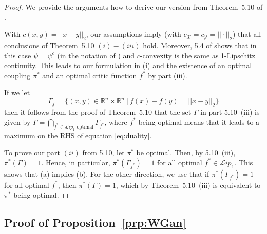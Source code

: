 \documentclass{article} %
\newcommand{\RR}[1][]{\mathbb{R}^{#1}}
\newcommand{\norm}[1]{||{#1}||_2}
\newcommand{\Li}[1]{\mathcal{L}ip_{#1}}
\newcommand{\supp}[1]{\text{supp}({#1})}
\begin{document}
\begin{proof}
We provide the arguments how to derive our version from Theorem~5.10 of \citet{optimalTransport}.

With $c(x,y)=\norm{x-y}$, our assumptions imply (with $c_{\mathcal{X}}=c_{\mathcal{Y}}=\norm{\cdot}$) that all conclusions of Theorem~5.10 $(i)-(iii)$ hold. Moreover, 5.4 of \citet{optimalTransport} shows that in this case $\psi=\psi^c$ (in the notation of \citet{optimalTransport}) and $c$-convexity is the same as 1-Lipschitz continuity. This leads to our formulation in (i) and the existence of an optimal coupling $\pi^*$ and an optimal critic function $f^*$ by part (iii).


If we let 
$$\Gamma_f=\{(x,y)\in \RR[n]\times\RR[n]\ |\ f(x)-f(y)=\norm{x-y} \}$$
then it follows from the proof of Theorem~5.10 that the set $\Gamma$ in part 5.10~(iii) is given by $\Gamma=\bigcap_{f^*\in\Li{1}\text{ optimal}}\Gamma_{f^*}$, where $f^*$ being optimal means that it leads to a maximum on the RHS of equation \eqref{eq:duality}. 


To prove our part $(ii)$ from 5.10, let $\pi^*$ be optimal. Then, by 5.10~(iii), $\pi^*(\Gamma)=1$. Hence, in particular, $\pi^*(\Gamma_{f^*})=1$ for all optimal $f^*\in\Li{1}$. This shows that (a) implies (b). For the other direction, we use that if $\pi^*(\Gamma_{f^*})=1$ for all optimal $f^*$, then $\pi^*(\Gamma)=1$, which by Theorem~5.10~(iii) is equivalent to $\pi^*$ being optimal. \end{proof}




\subsection{Proof of Proposition~\ref{prp:WGan}}\label{app:simpleProof}
\end{document}
